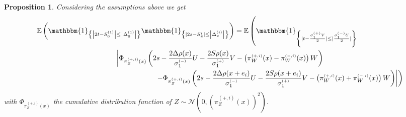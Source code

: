 \documentclass[12pt]{article}
\theoremstyle{Theorem}
\newtheorem{Proposition}[Theorem]{Proposition}
\begin{document}
\begin{Proposition}
\label{PropositionFourCell}
Considering the assumptions above we get 
{\small 
\begin{align}
\label{Thisthofour}
\mathbb{E}\left(\mathbbm{1}_{\left\{ \left|2t - S^{\scriptscriptstyle (1)}_{\scriptscriptstyle 0}\right| \leq \left|\Delta^{\scriptscriptstyle (1)}_{\scriptscriptstyle 0}\right|\right\}}\mathbbm{1}_{\left\{ \left|2s - S^{\scriptscriptstyle i}_{\scriptscriptstyle x}\right| \leq \left|\Delta^{\scriptscriptstyle (i)}_x\right| \right\}}\right) & = \mathbb{E}\left(\mathbbm{1}_{\left\{ |t - \frac{\sigma^{\scriptscriptstyle (+)}_{1}V}{2}| \leq |\frac{\sigma^{\scriptscriptstyle (-)}_{1}U}{2}|\right\}}\right. \nonumber\\
& \hspace{-6cm} \left. \left|\Phi_{ \pi^{\scriptscriptstyle(+, i)}_{Z}(x)}\left( 2s - \frac{2\Delta \rho(x) }{\sigma^{\scriptscriptstyle (-)}_{1}} U - \frac{2S\rho(x)}{\sigma^{\scriptscriptstyle (+)}_{1}}V - \left( \pi^{\scriptscriptstyle(+, i)}_{W}(x) -  \pi^{\scriptscriptstyle(-, i)}_{W}(x)\right) W \right) \right. \right.  \nonumber \\
& \hspace{-4cm}\left. \left.  - \Phi_{ \pi^{\scriptscriptstyle(+, i)}_{Z}(x)}\left( 2s - \frac{2\Delta \rho(x+e_i) }{\sigma^{\scriptscriptstyle (-)}_{1}}U - \frac{2S \rho(x+e_i) }{\sigma^{\scriptscriptstyle (+)}_{1}}V - \left( \pi^{\scriptscriptstyle(+, i)}_{W}(x) +  \pi^{\scriptscriptstyle(-, i)}_{W}(x) \right)W \right)  \right| \right)
\end{align}
}with $\Phi_{\pi^{\scriptscriptstyle(+, i)}_{Z}(x)}$ the cumulative distribution function of $Z \sim \mathcal{N}(0, (\pi^{\scriptscriptstyle(+, i)}_{Z}(x))^{2})$.
\end{Proposition}
\end{document}
